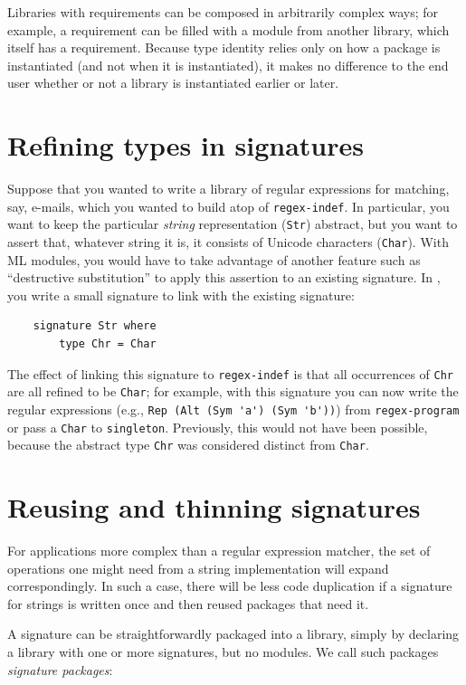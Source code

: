 Libraries with requirements can be composed in arbitrarily complex ways;
for example, a requirement can be filled with a module from another library,
which itself has a requirement.  Because type identity relies
only on how a package is instantiated (and not when it is instantiated),
it makes no difference to the end user whether or not a library
is instantiated earlier or later.

\section{Refining types in signatures}

Suppose that you wanted to write a library of regular expressions for
matching, say, e-mails, which you wanted to build atop of
\texttt{regex-indef}.  In particular, you want to keep the particular
\emph{string} representation (\verb|Str|) abstract, but you want
to assert that, whatever string it is, it consists of Unicode
characters (\verb|Char|).  With ML modules, you would have to take
advantage of another feature such as ``destructive substitution''
to apply this assertion to an existing signature.  In \Backpack{}, you
write a small signature to link with the existing signature:

\begin{verbatim}
    signature Str where
        type Chr = Char
\end{verbatim}

The effect of linking this signature to \verb|regex-indef| is that
all occurrences of \verb|Chr| are all refined to be \verb|Char|;
for example, with this signature you can now write the regular
expressions (e.g., \verb|Rep (Alt (Sym 'a') (Sym 'b'))|) from
\verb|regex-program| or pass a \verb|Char| to \verb|singleton|.
Previously, this would not have been possible, because the
abstract type \verb|Chr| was considered distinct from \verb|Char|.

\section{Reusing and thinning signatures}

For applications more complex than a regular expression matcher, the set
of operations one might need from a string implementation will expand
correspondingly.  In such a case, there will be less code duplication if
a signature for strings is written once and then reused packages that
need it.

A signature can be straightforwardly packaged into a library, simply
by declaring a library with one or more signatures, but no modules.
We call such packages \emph{signature packages}:


